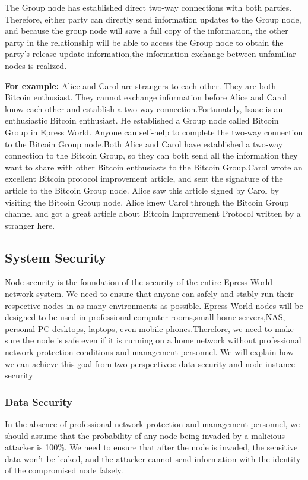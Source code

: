 \documentclass{article}
\begin{document}
    The Group node has established  direct two-way connections with both parties. Therefore, either party can directly send information updates to the Group node, and because the group node will save a full copy of the information, the other party in the relationship will be able to access the Group node to obtain the party's release update information,the information exchange between unfamiliar nodes is realized.
    \newline
    \begin{blockqt}
    \textbf{For example: }Alice and Carol are strangers to each other. They are both Bitcoin enthusiast. They cannot exchange information before Alice and Carol know each other and establish a two-way connection.Fortunately, Isaac is an enthusiastic Bitcoin enthusiast. He established a Group node called Bitcoin Group in Epress World. Anyone can self-help to complete the two-way connection to the Bitcoin Group node.Both Alice and Carol have established a two-way connection to the Bitcoin Group, so they can both send all the information they want to share with other Bitcoin enthusiasts to the Bitcoin Group.Carol wrote an excellent Bitcoin protocol improvement article, and sent the signature of the article to the Bitcoin Group node. Alice saw this article signed by Carol by visiting the Bitcoin Group node. Alice knew  Carol through the Bitcoin Group channel and got a great article about Bitcoin Improvement Protocol written by a stranger here.
    \end{blockqt}
\subsection{System Security}
    Node security is the foundation of the security of the entire Epress World network system. We need to ensure that anyone can safely and stably run their respective nodes in as many environments as possible. Epress World nodes will be designed to be used in professional computer rooms,small home servers,NAS, personal PC desktops, laptops, even mobile phones.Therefore, we need to make sure the node  is safe even if it is running on a home network without professional network protection conditions and management personnel. We will explain how we can achieve this goal from two perspectives: data security and node instance security
\subsubsection{Data Security}
    In the absence of professional network protection and management personnel, we should assume that the probability of any node being invaded by a malicious attacker is 100\%. We need to ensure that after the node is invaded, the sensitive data won't be leaked, and the attacker cannot send information with the identity of the compromised node falsely.
\end{document}
